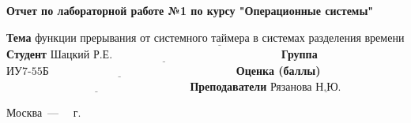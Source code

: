 \begin{titlepage}
    \begin{center}
        \Large\textbf{Отчет по лабораторной работе №1 по курсу "Операционные системы"}\newline
    \end{center}

    \noindent\textbf{Тема} $\underline{\text{функции прерывания от системного таймера в системах разделения времени}}$\newline\newline\newline
    \noindent\textbf{Студент} $\underline{\text{Шацкий Р.Е.~~~~~~~~~~~~~~~~~~~~~~~~~~~~~~~~~~~~~~~~~~~~~}}$\newline\newline
    \noindent\textbf{Группа} $\underline{\text{ИУ7-55Б~~~~~~~~~~~~~~~~~~~~~~~~~~~~~~~~~~~~~~~~~~~~~~~~~~}}$\newline\newline
    \noindent\textbf{Оценка (баллы)} $\underline{\text{~~~~~~~~~~~~~~~~~~~~~~~~~~~~~~~~~~~~~~~~~~~~~~~~~}}$\newline\newline
    \noindent\textbf{Преподаватели} $\underline{\text{Рязанова Н.Ю.~~~~~~~~~~~}}$\newline

    \begin{center}
        \vfill
        Москва~---~\the\year
        ~г.
    \end{center}
    \restoregeometry
\end{titlepage}
